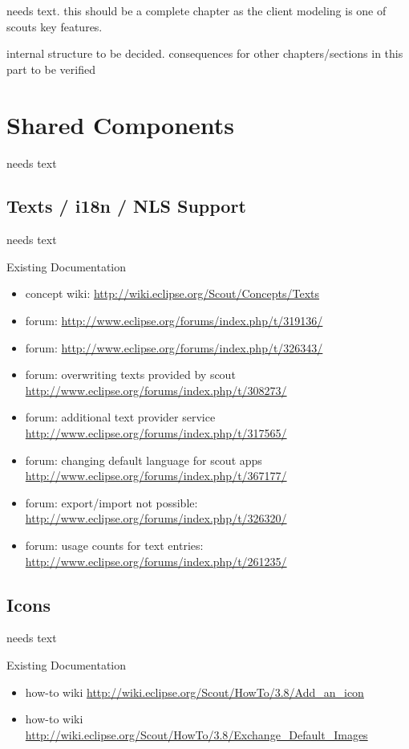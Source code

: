 \documentclass[a4paper,10pt,twoside]{book}
\begin{document}
needs text. this should be a complete chapter as the client modeling is one
of scouts key features.

internal structure to be decided. consequences for other chapters/sections in
this part to be verified

\chapter{Shared Components}
needs text
  
\section{Texts / i18n / NLS Support}
needs text

\noindent Existing Documentation
\begin{itemize}
  \item concept wiki: \url{http://wiki.eclipse.org/Scout/Concepts/Texts}
  \item forum: \url{http://www.eclipse.org/forums/index.php/t/319136/}
  \item forum: \url{http://www.eclipse.org/forums/index.php/t/326343/}
  \item forum: overwriting texts provided by scout \url{http://www.eclipse.org/forums/index.php/t/308273/}
  \item forum: additional text provider service \url{http://www.eclipse.org/forums/index.php/t/317565/}
  \item forum: changing default language for scout apps \url{http://www.eclipse.org/forums/index.php/t/367177/}
  \item forum: export/import not possible: \url{http://www.eclipse.org/forums/index.php/t/326320/}
  \item forum: usage counts for text entries: \url{http://www.eclipse.org/forums/index.php/t/261235/}
\end{itemize}

\section{Icons}
needs text

\noindent Existing Documentation
\begin{itemize}
  \item how-to wiki \url{http://wiki.eclipse.org/Scout/HowTo/3.8/Add_an_icon}
  \item how-to wiki \url{http://wiki.eclipse.org/Scout/HowTo/3.8/Exchange_Default_Images}
\end{itemize}
\end{document}
